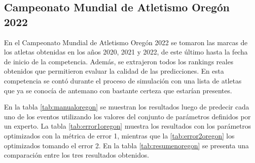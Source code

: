 \subsection{Campeonato Mundial de Atletismo Oregón 2022}

En el Campeonato Mundial de Atletismo Oregón 2022 se tomaron las marcas de los atletas obtenidas en los años 2020, 2021 y 2022, de este último hasta la fecha de inicio de la competencia. Además, se extrajeron todos los rankings reales obtenidos que permitieron evaluar la calidad de las predicciones. En esta competencia se contó durante el proceso de simulación con una lista de atletas que ya se conocía de antemano con bastante certeza que estarían presentes.

En la tabla \ref{tab:manualoregon} se muestran los resultados luego de predecir cada uno de los eventos utilizando los valores del conjunto de parámetros definidos por un experto. La tabla \ref{tab:error1oregon} muestra los resultados con los parámetros optimizados con la métrica de error 1, mientras que la \ref{tab:error2oregon} los optimizados tomando el error 2. En la tabla \ref{tab:resumenoregon} se presenta una comparación entre los tres resultados obtenidos.

